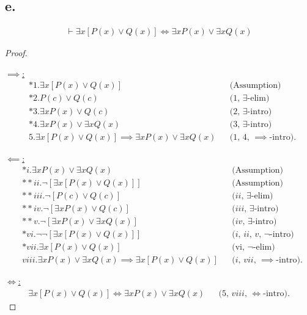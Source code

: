 \documentclass{article}
\begin{document}
\newpage

\subsection*{e.}

\begin{align*}
  \vdash 
  \exists x \left[ P(x) \lor Q(x) \right]
  \iff
  \exists x P(x) \lor \exists x Q(x)
\end{align*}

\begin{proof}
  $ $

  \underline{$\implies$:}
  \begin{align*}
    &*1. \exists x \left[ P(x) \lor Q(x) \right] &&\text{(Assumption)} \\
    &*2. P(c) \lor Q(c) &&\text{($1$, $\exists$-elim)} \\
    &*3. \exists x P(x) \lor Q(c) &&\text{($2$, $\exists$-intro)} \\
    &*4. \exists x P(x) \lor \exists x Q(x) &&\text{($3$, $\exists$-intro)} \\
    &5. \exists x \left[ P(x) \lor Q(x) \right]
    \implies
    \exists x P(x) \lor \exists x Q(x) &&\text{($1$, $4$, $\implies$-intro)}.
  \end{align*}

  \underline{$\impliedby$:}
  \begin{align*}
    &*i. \exists x P(x) \lor \exists x Q(x) &&\text{(Assumption)} \\
    &**ii. \lnot \left[ \exists x \left[ P(x) \lor Q(x) \right] \right] &&\text{(Assumption)} \\
    &**iii. \lnot \left[ P(c) \lor Q(c) \right] &&\text{($ii$, $\exists$-elim)} \\
    &**iv. \lnot \left[ \exists x P(x) \lor Q(c) \right] &&\text{($iii$, $\exists$-intro)} \\
    &**v. \lnot \left[ \exists x P(x) \lor \exists x Q(x) \right] &&\text{($iv$, $\exists$-intro)} \\
    &*vi. \lnot \lnot \left[ \exists x \left[ P(x) \lor Q(x) \right] \right]  &&\text{($i$, $ii$, $v$, $\lnot$-intro)} \\
    &*vii. \exists x \left[ P(x) \lor Q(x) \right] &&\text{(vi, $\lnot$-elim)} \\
    &viii. \exists x P(x) \lor \exists x Q(x)
    \implies
    \exists x \left[ P(x) \lor Q(x) \right] &&\text{($i$, $vii$, $\implies$-intro)}.
  \end{align*}

  \underline{$\iff$:}
  \begin{align*}
    \exists x \left[ P(x) \lor Q(x) \right]
    \iff
    \exists x P(x) \lor \exists x Q(x) &&\text{($5$, $viii$, $\iff$-intro)}.
  \end{align*}

\end{proof}
\end{document}
